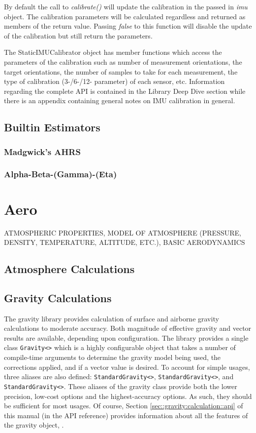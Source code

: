 \documentclass[10pt,letterpaper]{memoir} %
\begin{document}
By default the call to \emph{calibrate()} will update the calibration in the passed in \emph{imu} object.  The calibration parameters will be calculated regardless and returned as members of the return value.  Passing \emph{false} to this function will disable the update of the calibration but still return the parameters.

The StaticIMUCalibrator object has member functions which access the parameters of the calibration such as number of measurement orientations, the target orientations, the number of samples to take for each measurement, the type of calibration (3-/6-/12- parameter) of each sensor, etc.  Information regarding the complete API is contained in the Library Deep Dive section while there is an appendix containing general notes on IMU calibration in general.

\subsection{Builtin Estimators}
\subsubsection{Madgwick's AHRS}
\subsubsection{Alpha-Beta-(Gamma)-(Eta)}

\section{Aero}
ATMOSPHERIC PROPERTIES, MODEL OF ATMOSPHERE (PRESSURE, DENSITY, TEMPERATURE, ALTITUDE, ETC.), BASIC AERODYNAMICS
\subsection{Atmosphere Calculations}
\subsection{Gravity Calculations}
The gravity library provides calculation of surface and airborne gravity calculations to moderate accuracy.  Both magnitude of effective gravity and vector results are available, depending upon configuration.  The library provides a single class \texttt{Gravity<>} which is a highly configurable object that takes a number of compile-time arguments to determine the gravity model being used, the corrections applied, and if a vector value is desired.  To account for simple usages, three aliases are also defined: \texttt{StandardGravity<>}, \texttt{StandardGravity<>}, and \texttt{StandardGravity<>}.  These aliases of the gravity class provide both the lower precision, low-cost options and the highest-accuracy options.  As such, they should be sufficient for most usages.  Of course, Section \ref{sec::gravity:calculation::api} of this manual (in the API reference) provides information about all the features of the gravity object, . 
\end{document}

